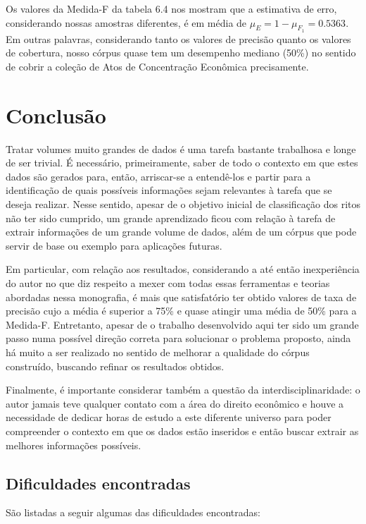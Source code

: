 \documentclass[11pt]{report}
\begin{document}
Os valores da Medida-F da tabela 6.4 nos mostram que a estimativa de erro, considerando nossas amostras diferentes, é em média de $\mu_{E} = 1 - \mu_{F_1} = 0.5363$. Em outras palavras,
considerando tanto os valores de precisão quanto os valores de cobertura, nosso córpus quase tem um desempenho mediano (50\%) no sentido de cobrir a coleção de Atos de Concentração Econômica precisamente.

\pagebreak
\chapter{Conclusão}

\indent\indent Tratar volumes muito grandes de dados é uma tarefa bastante trabalhosa e longe de ser trivial. É necessário, primeiramente, saber de todo o contexto
em que estes dados são gerados para, então, arriscar-se a entendê-los e partir para a identificação de quais possíveis informações sejam relevantes à tarefa que se deseja realizar. Nesse sentido, apesar de o objetivo inicial de classificação dos ritos não ter sido cumprido, um grande
aprendizado ficou com relação à tarefa de extrair informações de um grande volume de dados, além de um córpus que pode servir de base ou exemplo para aplicações futuras.

Em particular, com relação aos resultados, considerando a até então inexperiência do autor no que diz respeito a mexer com todas essas ferramentas e teorias abordadas nessa monografia,
é mais que satisfatório ter obtido valores de taxa de precisão cujo a média é superior a 75\% e quase atingir uma média de 50\% para a Medida-F. Entretanto, apesar de o trabalho desenvolvido aqui ter sido um grande passo numa possível direção correta para solucionar o problema proposto, ainda há muito a ser realizado no sentido de melhorar a qualidade do córpus construído, buscando refinar os resultados obtidos.

Finalmente, é importante considerar também a questão da interdisciplinaridade: o autor jamais teve qualquer contato com a área do direito econômico e houve a necessidade de dedicar horas
de estudo a este diferente universo para poder compreender o contexto em que os dados estão inseridos e então buscar extrair as melhores informações possíveis.

\section{Dificuldades encontradas}

\indent\indent São listadas a seguir algumas das dificuldades encontradas:
\end{document}

